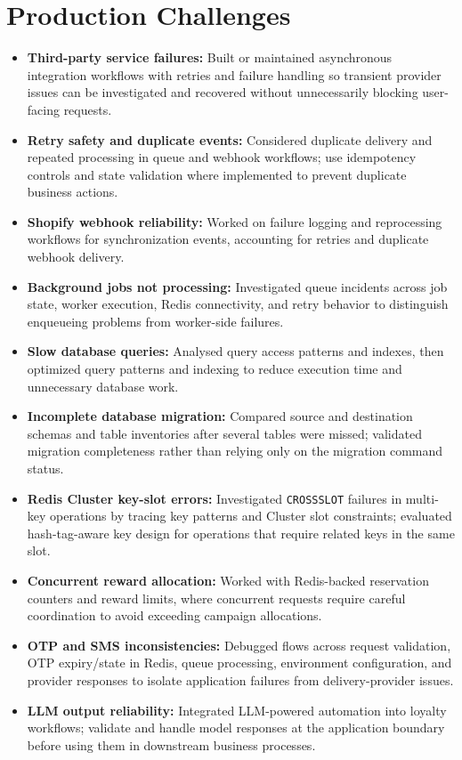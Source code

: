 \documentclass[letterpaper,10pt]{article}
\newcommand{\itemx}[1]{\item\small{#1\vspace{-2pt}}}
\begin{document}
\section{Production Challenges}
\begin{itemize}[leftmargin=.18in]
\itemx{\textbf{Third-party service failures:} Built or maintained asynchronous integration workflows with retries and failure handling so transient provider issues can be investigated and recovered without unnecessarily blocking user-facing requests.}
\itemx{\textbf{Retry safety and duplicate events:} Considered duplicate delivery and repeated processing in queue and webhook workflows; use idempotency controls and state validation where implemented to prevent duplicate business actions.}
\itemx{\textbf{Shopify webhook reliability:} Worked on failure logging and reprocessing workflows for synchronization events, accounting for retries and duplicate webhook delivery.}
\itemx{\textbf{Background jobs not processing:} Investigated queue incidents across job state, worker execution, Redis connectivity, and retry behavior to distinguish enqueueing problems from worker-side failures.}
\itemx{\textbf{Slow database queries:} Analysed query access patterns and indexes, then optimized query patterns and indexing to reduce execution time and unnecessary database work.}
\itemx{\textbf{Incomplete database migration:} Compared source and destination schemas and table inventories after several tables were missed; validated migration completeness rather than relying only on the migration command status.}
\itemx{\textbf{Redis Cluster key-slot errors:} Investigated \texttt{CROSSSLOT} failures in multi-key operations by tracing key patterns and Cluster slot constraints; evaluated hash-tag-aware key design for operations that require related keys in the same slot.}
\itemx{\textbf{Concurrent reward allocation:} Worked with Redis-backed reservation counters and reward limits, where concurrent requests require careful coordination to avoid exceeding campaign allocations.}
\itemx{\textbf{OTP and SMS inconsistencies:} Debugged flows across request validation, OTP expiry/state in Redis, queue processing, environment configuration, and provider responses to isolate application failures from delivery-provider issues.}
\itemx{\textbf{LLM output reliability:} Integrated LLM-powered automation into loyalty workflows; validate and handle model responses at the application boundary before using them in downstream business processes.}
\end{itemize}
\end{document}
